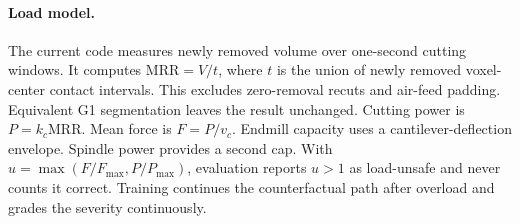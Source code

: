 \documentclass{article}
\begin{document}
\paragraph{Load model.}
The current code measures newly removed volume over one-second cutting
windows.  It computes $\mathrm{MRR}=V/t$, where $t$ is the union of newly
removed voxel-center contact intervals.  This excludes zero-removal recuts
and air-feed padding.  Equivalent G1 segmentation leaves the result
unchanged.  Cutting power is $P=k_c\mathrm{MRR}$.  Mean force is
$F=P/v_c$.  Endmill capacity uses a cantilever-deflection envelope.
Spindle power provides a second cap.  With
$u=\max(F/F_{\max},P/P_{\max})$, evaluation reports $u>1$ as load-unsafe
and never counts it correct.  Training continues the counterfactual path
after overload and grades the severity continuously.
\end{document}
